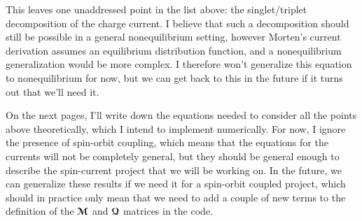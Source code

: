 This leaves one unaddressed point in the list above: the singlet/triplet decomposition of the charge current.
I believe that such a decomposition should still be possible in a general nonequilibrium setting, however Morten's current derivation assumes an equilibrium distribution function, and a nonequilibrium generalization would be more complex.
I therefore won't generalize this equation to nonequilibrium for now, but we can get back to this in the future if it turns out that we'll need it.

On the next pages, I'll write down the equations needed to consider all the points above theoretically, which I intend to implement numerically.
For now, I ignore the presence of spin-orbit coupling, which means that the equations for the currents will not be completely general, but they should be general enough to describe the spin-current project that we will be working on.
In the future, we can generalize these results if we need it for a spin-orbit coupled project, which should in practice only mean that we need to add a couple of new terms to the definition of the $\bm{\mathcal{M}}$ and $\bm{\mathcal{Q}}$ matrices in the code.



\clearpage
